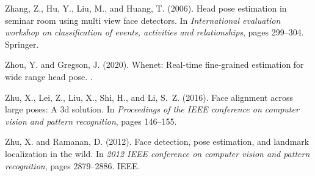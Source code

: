 \documentclass[a4paper,twoside]{article}
\begin{document}
{\begin{thebibliography}{}
Zhang, Z., Hu, Y., Liu, M., and Huang, T. (2006).
\newblock Head pose estimation in seminar room using multi view face detectors.
\newblock In {\em International evaluation workshop on classification of
  events, activities and relationships}, pages 299--304. Springer.

Zhou, Y. and Gregson, J. (2020).
\newblock Whenet: Real-time fine-grained estimation for wide range head pose.
.

Zhu, X., Lei, Z., Liu, X., Shi, H., and Li, S.~Z. (2016).
\newblock Face alignment across large poses: A 3d solution.
\newblock In {\em Proceedings of the IEEE conference on computer vision and
  pattern recognition}, pages 146--155.

Zhu, X. and Ramanan, D. (2012).
\newblock Face detection, pose estimation, and landmark localization in the
  wild.
\newblock In {\em 2012 IEEE conference on computer vision and pattern
  recognition}, pages 2879--2886. IEEE.

\end{thebibliography}}
\end{document}

